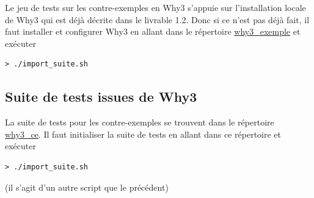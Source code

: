 \documentclass[a4paper,11pt]{article}
\begin{document}
Le jeu de tests sur les contre-exemples en Why3 s'appuie sur
l'installation locale de Why3 qui est déjà décrite dans le livrable
1.2. Donc si ce n'est pas déjà fait, il faut installer et configurer Why3 en allant dans le répertoire \url{why3_exemple} et exécuter
\begin{lstlisting}
> ./import_suite.sh
\end{lstlisting}

\subsection{Suite de tests issues de Why3}

La suite de tests pour les contre-exemples se trouvent dans le
répertoire \url{why3_ce}. Il faut initialiser la suite de tests en
allant dans ce répertoire et exécuter
\begin{lstlisting}
> ./import_suite.sh
\end{lstlisting}
(il s'agit d'un autre script que le précédent)
\end{document}
